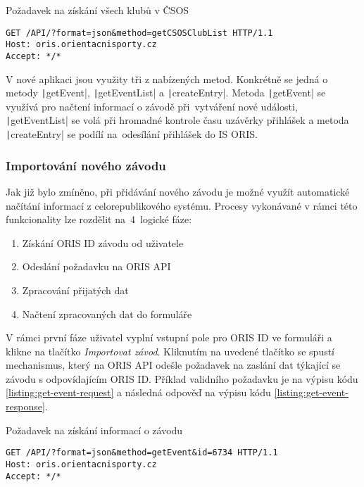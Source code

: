 \begin{listing}[h]
    \caption{Požadavek na získání všech klubů v ČSOS}\label{listing:api}
    \begin{verbatim}
GET /API/?format=json&method=getCSOSClubList HTTP/1.1
Host: oris.orientacnisporty.cz
Accept: */*
    \end{verbatim}
\end{listing}

V nové aplikaci jsou využity tři z nabízených metod. Konkrétně se jedná o metody \texttt|getEvent|, \texttt|getEventList| a \texttt|createEntry|. Metoda \texttt|getEvent| se využívá pro načtení informací o závodě při~vytváření nové události, \texttt|getEventList| se volá při hromadné kontrole času uzávěrky přihlášek a metoda \texttt|createEntry| se podílí na~odesílání přihlášek do IS ORIS.

\subsubsection{Importování nového závodu}
Jak již bylo zmíněno, při přidávání nového závodu je možné využít automatické načítání informací z celorepublikového systému. Procesy vykonávané v rámci této funkcionality lze rozdělit na~4~logické fáze:
\begin{enumerate}
    \item Získání ORIS ID závodu od uživatele
    \item Odeslání požadavku na ORIS API
    \item Zpracování přijatých dat
    \item Načtení zpracovaných dat do formuláře
\end{enumerate}

V rámci první fáze uživatel vyplní vstupní pole pro ORIS ID ve formuláři a klikne na tlačítko \emph{Importovat závod}. Kliknutím na uvedené tlačítko se spustí mechanismus, který na ORIS API odešle požadavek na zaslání dat týkající se závodu s odpovídajícím ORIS ID. Příklad validního požadavku je na výpisu kódu \ref{listing:get-event-request} a následná odpověď na výpisu kódu \ref{listing:get-event-response}.

\begin{listing}[h]
    \caption{Požadavek na získání informací o závodu}\label{listing:get-event-request}
    \begin{verbatim}
GET /API/?format=json&method=getEvent&id=6734 HTTP/1.1
Host: oris.orientacnisporty.cz
Accept: */*
    \end{verbatim}
\end{listing}
\vspace{-3mm}

